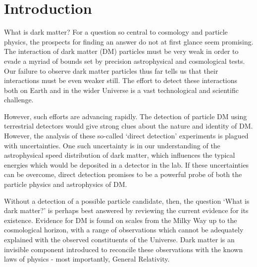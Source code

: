 \chapter{Introduction}



What is dark matter? For a question so central to cosmology and particle physics, the prospects for finding an answer do not at first glance seem promising. The interaction of dark matter (DM) particles must be very weak in order to evade a myriad of bounds set by precision astrophysical and cosmological tests. Our failure to observe dark matter particles thus far tells us that their interactions must be even weaker still. The effort to detect these interactions both on Earth and in the wider Universe is a vast technological and scientific challenge.

However, such efforts are advancing rapidly. The detection of particle DM using terrestrial detectors would give strong clues about the nature and identity of DM. However, the analysis of these so-called `direct detection' experiments is plagued with uncertainties. One such uncertainty is in our understanding of the astrophysical speed distribution of dark matter, which influences the typical energies which would be deposited in a detector in the lab. If these uncertainties can be overcome, direct detection promises to be a powerful probe of both the particle physics and astrophysics of DM.

Without a detection of a possible particle candidate, then, the question `What is dark matter?' is perhaps best answered by reviewing the current evidence for its existence. Evidence for DM is found on scales from the Milky Way up to the cosmological horizon, with a range of observations which cannot be adequately explained with the observed constituents of the Universe. Dark matter is an invisible component introduced to reconcile these observations with the known laws of physics - most importantly, General Relativity.

